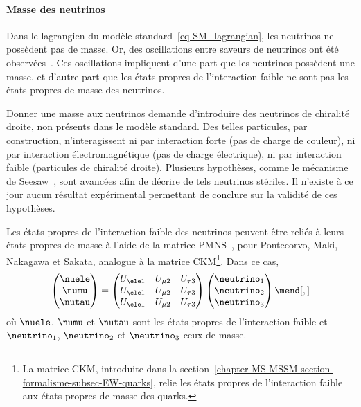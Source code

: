 \paragraph{Masse des neutrinos}
Dans le lagrangien du modèle standard~\eqref{eq-SM_lagrangian}, les neutrinos ne possèdent pas de masse.
Or, des oscillations entre saveurs de neutrinos ont été observées~\cite{neutrino_oscillations_1,neutrino_oscillations_2}.
Ces oscillations impliquent d'une part que les neutrinos possèdent une masse, et d'autre part que les états propres de l'interaction faible ne sont pas les états propres de masse des neutrinos.
\par Donner une masse aux neutrinos demande d'introduire des neutrinos de chiralité droite, non présents dans le modèle standard.
Des telles particules, par construction, n'interagissent ni par interaction forte (pas de charge de couleur), ni par interaction électromagnétique (pas de charge électrique), ni par interaction faible (particules de chiralité droite).
Plusieurs hypothèses, comme le mécanisme de Seesaw~\cite{neutrino_masses_1,neutrino_masses_2,neutrino_masses_3,neutrino_masses_4,neutrino_masses_5}, sont avancées afin de décrire de tels neutrinos stériles.
Il n'existe à ce jour aucun résultat expérimental permettant de conclure sur la validité de ces hypothèses.
\par Les états propres de l'interaction faible des neutrinos peuvent être reliés à leurs états propres de masse à l'aide de la matrice PMNS~\cite{PMNS_MNS}, pour Pontecorvo, Maki, Nakagawa et Sakata, analogue à la matrice CKM\footnote{La matrice CKM, introduite dans la section~\ref{chapter-MS-MSSM-section-formalisme-subsec-EW-quarks}, relie les états propres de l'interaction faible aux états propres de masse des quarks.}.
Dans ce cas,
\begin{equation}
\begin{pmatrix}
\nuele \\ \numu \\ \nutau
\end{pmatrix}
=
\begin{pmatrix}
U_{\ele 1} & U_{\mu 2} & U_{\tau 3} \\
U_{\ele 1} & U_{\mu 2} & U_{\tau 3} \\
U_{\ele 1} & U_{\mu 2} & U_{\tau 3} \\
\end{pmatrix}
\begin{pmatrix}
\neutrino_1 \\ \neutrino_2 \\ \neutrino_3
\end{pmatrix}
\mend[,]
\end{equation}
où $\nuele$, $\numu$ et $\nutau$ sont les états propres de l'interaction faible et $\neutrino_1$, $\neutrino_2$ et $\neutrino_3$ ceux de masse.
